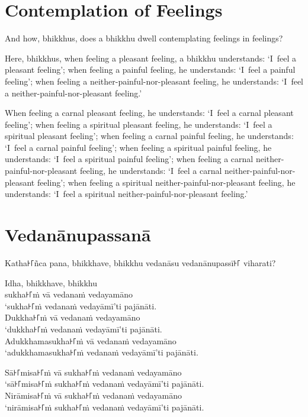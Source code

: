 

\englishPage
\chapter{Contemplation of Feelings}

And how, bhikkhus, does a bhikkhu dwell contemplating feelings in feelings?

Here, bhikkhus, when feeling a pleasant feeling, a bhikkhu understands:
`I~feel a pleasant feeling';
when feeling a painful feeling, he understands:
`I~feel a painful feeling';
when feeling a neither-painful-nor-pleasant feeling, he understands:
`I~feel a neither-painful-nor-pleasant feeling.'

When feeling a carnal pleasant feeling, he understands:
`I~feel a carnal pleasant feeling';
when feeling a spiritual pleasant feeling, he understands:
`I~feel a spiritual pleasant feeling';
when feeling a carnal painful feeling, he understands:
`I~feel a carnal painful feeling';
when feeling a spiritual painful feeling, he understands:
`I~feel a spiritual painful feeling';
when feeling a carnal neither-painful-nor-pleasant feeling, he understands:
`I~feel a carnal neither-painful-nor-pleasant feeling';
when feeling a spiritual neither-painful-nor-pleasant feeling, he understands:
`I~feel a spiritual neither-painful-nor-pleasant feeling.'

\paliPage
\chapter*{Vedanānupassanā}

Katha꜔꜒ñca pana, bhikkhave, bhikkhu vedanāsu vedanānupassī꜔꜒ viharati?

Idha, bhikkhave, bhikkhu\\
sukha꜔꜒ṁ vā vedanaṁ vedayamāno\\
‘sukha꜔꜒ṁ vedanaṁ vedayāmī’ti pajānāti.\\
Dukkha꜔꜒ṁ vā vedanaṁ vedayamāno\\
‘dukkha꜔꜒ṁ vedanaṁ vedayāmī’ti pajānāti.\\
Adukkhamasukha꜔꜒ṁ vā vedanaṁ vedayamāno\\
‘adukkhamasukha꜔꜒ṁ vedanaṁ vedayāmī’ti pajānāti.

Sā꜔꜒misa꜔꜒ṁ vā sukha꜔꜒ṁ vedanaṁ vedayamāno\\
‘sā꜔꜒misa꜔꜒ṁ sukha꜔꜒ṁ vedanaṁ vedayāmī’ti pajānāti.\\
Nirāmisa꜔꜒ṁ vā sukha꜔꜒ṁ vedanaṁ vedayamāno\\
‘nirāmisa꜔꜒ṁ sukha꜔꜒ṁ vedanaṁ vedayāmī’ti pajānāti.

